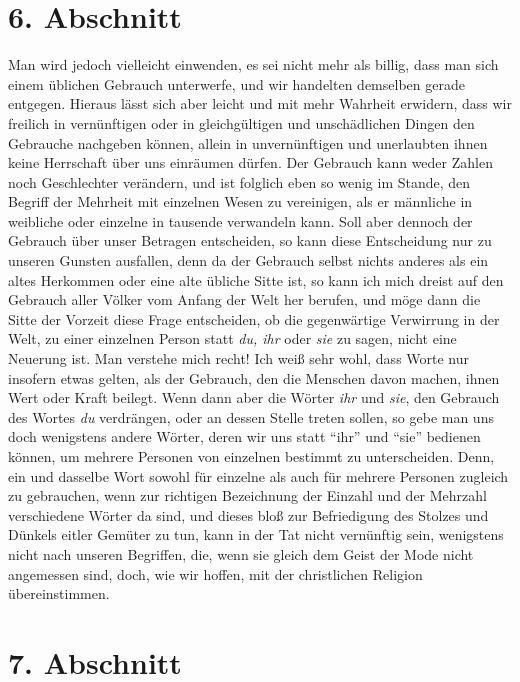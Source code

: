 \section{6. Abschnitt} \label{kap10_ab6}

Man wird jedoch vielleicht einwenden, es sei
nicht mehr als billig, dass man sich
einem üblichen Gebrauch unterwerfe, und wir handelten demselben gerade
entgegen. Hieraus lässt sich aber leicht und mit mehr Wahrheit erwidern, dass
wir freilich in vernünftigen oder in gleichgültigen und unschädlichen Dingen den
Gebrauche nachgeben können, allein in unvernünftigen und unerlaubten ihnen keine
Herrschaft über uns einräumen dürfen. Der Gebrauch kann weder Zahlen noch
Geschlechter verändern, und ist folglich eben so wenig im Stande, den Begriff
der Mehrheit mit einzelnen Wesen zu vereinigen, als er männliche in weibliche
oder einzelne in tausende verwandeln kann. Soll aber dennoch der Gebrauch über
unser Betragen entscheiden, so kann diese Entscheidung nur zu unseren Gunsten
ausfallen, denn da der Gebrauch selbst nichts anderes als ein altes Herkommen
oder eine alte übliche Sitte ist, so kann ich mich dreist auf den Gebrauch aller
Völker vom Anfang der Welt her berufen, und möge dann die Sitte der Vorzeit
diese Frage entscheiden, ob die gegenwärtige Verwirrung in der Welt, zu einer
einzelnen Person statt \textit{du, ihr} oder \textit{sie} zu sagen, nicht eine
Neuerung
ist.  Man verstehe mich recht! Ich weiß sehr wohl,
dass Worte nur insofern etwas
gelten, als der Gebrauch, den die Menschen davon machen, ihnen Wert oder Kraft
beilegt. Wenn dann aber die Wörter \textit{ihr} und \textit{sie}, den Gebrauch
des Wortes
\textit{du} verdrängen, oder an dessen Stelle treten sollen, so gebe man uns
doch
wenigstens andere Wörter, deren wir uns statt "`ihr"' und "`sie"' bedienen können, um
mehrere Personen von einzelnen bestimmt zu unterscheiden. Denn, ein und dasselbe
Wort sowohl für einzelne als auch für mehrere Personen zugleich zu gebrauchen,
wenn zur richtigen Bezeichnung der Einzahl und der Mehrzahl verschiedene Wörter
da sind, und dieses bloß zur Befriedigung des Stolzes und Dünkels eitler
Gemüter zu tun, kann in der Tat nicht vernünftig sein, wenigstens nicht nach
unseren Begriffen, die, wenn sie gleich dem Geist der Mode nicht angemessen
sind, doch, wie wir hoffen, mit der christlichen Religion übereinstimmen.

\section{7. Abschnitt} \label{kap10_ab7}

